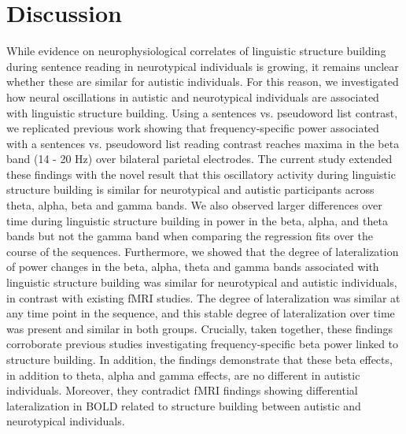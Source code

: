 \section*{Discussion}
While evidence on neurophysiological correlates of linguistic structure building during sentence reading in neurotypical individuals is growing, it remains unclear whether these are similar for autistic individuals. For this reason, we investigated how neural oscillations in autistic and neurotypical individuals are associated with linguistic structure building. Using a sentences vs. pseudoword list contrast, we replicated previous work showing that frequency-specific power associated with a sentences vs. pseudoword list reading contrast reaches maxima in the beta band (14 - 20 Hz) over bilateral parietal electrodes. The current study extended these findings with the novel result that this oscillatory activity during linguistic structure building is similar for neurotypical and autistic participants across theta, alpha, beta and gamma bands. We also observed larger differences over time during linguistic structure building in power in the beta, alpha, and theta bands but not the gamma band when comparing the regression fits over the course of the sequences. Furthermore, we showed that the degree of lateralization of power changes in the beta, alpha, theta and gamma bands associated with linguistic structure building was similar for neurotypical and autistic individuals, in contrast with existing fMRI studies. The degree of lateralization was similar at any time point in the sequence, and this stable degree of lateralization over time was present and similar in both groups. Crucially, taken together, these findings corroborate previous studies investigating frequency-specific beta power linked to structure building. In addition, the findings demonstrate that these beta effects, in addition to theta, alpha and gamma effects, are no different in autistic individuals. Moreover, they contradict fMRI findings \citep{jouravlev2020} showing differential lateralization in BOLD related to structure building between autistic and neurotypical individuals.

